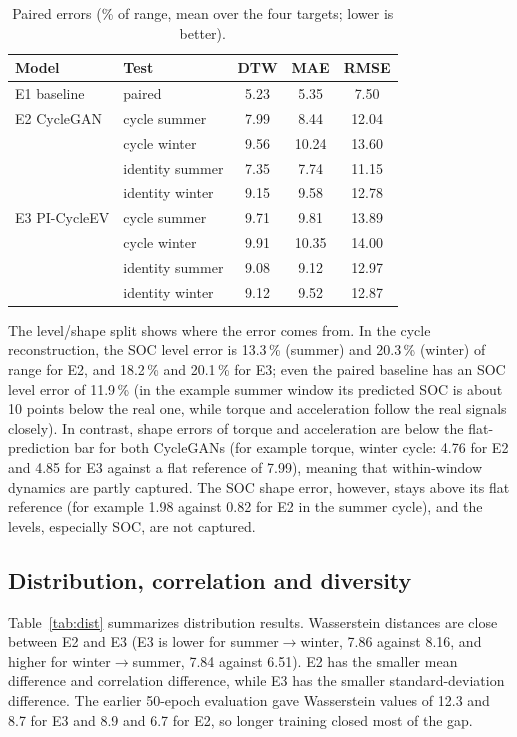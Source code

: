 \documentclass[conference]{IEEEtran}
\begin{document}
\begin{table}[t]
\caption{Paired errors (\% of range, mean over the four targets; lower is better).}
\label{tab:paired}
\centering\small
\setlength{\tabcolsep}{3.5pt}
\begin{tabular}{llccc}
\toprule
Model & Test & DTW & MAE & RMSE\\
\midrule
E1 baseline & paired & 5.23 & 5.35 & 7.50\\
\midrule
E2 CycleGAN & cycle summer & 7.99 & 8.44 & 12.04\\
 & cycle winter & 9.56 & 10.24 & 13.60\\
 & identity summer & 7.35 & 7.74 & 11.15\\
 & identity winter & 9.15 & 9.58 & 12.78\\
\midrule
E3 PI-CycleEV & cycle summer & 9.71 & 9.81 & 13.89\\
 & cycle winter & 9.91 & 10.35 & 14.00\\
 & identity summer & 9.08 & 9.12 & 12.97\\
 & identity winter & 9.12 & 9.52 & 12.87\\
\bottomrule
\end{tabular}
\end{table}

The level/shape split shows where the error comes from. In the cycle reconstruction, the SOC level error is 13.3\,\% (summer) and 20.3\,\% (winter) of range for E2, and 18.2\,\% and 20.1\,\% for E3; even the paired baseline has an SOC level error of 11.9\,\% (in the example summer window its predicted SOC is about 10 points below the real one, while torque and acceleration follow the real signals closely). In contrast, shape errors of torque and acceleration are below the flat-prediction bar for both CycleGANs (for example torque, winter cycle: 4.76 for E2 and 4.85 for E3 against a flat reference of 7.99), meaning that within-window dynamics are partly captured. The SOC shape error, however, stays above its flat reference (for example 1.98 against 0.82 for E2 in the summer cycle), and the levels, especially SOC, are not captured.

\subsection{Distribution, correlation and diversity}
Table~\ref{tab:dist} summarizes distribution results. Wasserstein distances are close between E2 and E3 (E3 is lower for summer$\rightarrow$winter, 7.86 against 8.16, and higher for winter$\rightarrow$summer, 7.84 against 6.51). E2 has the smaller mean difference and correlation difference, while E3 has the smaller standard-deviation difference. The earlier 50-epoch evaluation gave Wasserstein values of 12.3 and 8.7 for E3 and 8.9 and 6.7 for E2, so longer training closed most of the gap.
\end{document}
